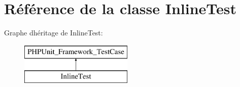\hypertarget{class_symfony_1_1_component_1_1_yaml_1_1_tests_1_1_inline_test}{}\section{Référence de la classe Inline\+Test}
\label{class_symfony_1_1_component_1_1_yaml_1_1_tests_1_1_inline_test}
Graphe d\textquotesingle{}héritage de Inline\+Test\+:\begin{figure}[H]
\begin{center}
\leavevmode
\includegraphics[height=2.000000cm]{class_symfony_1_1_component_1_1_yaml_1_1_tests_1_1_inline_test}
\end{center}
\end{figure}
